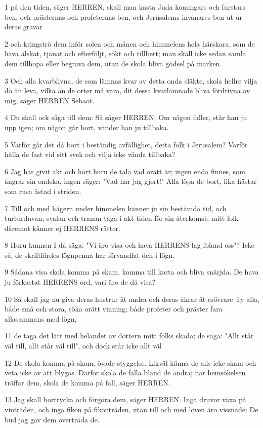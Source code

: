 \par 1 på den tiden, säger HERREN, skall man kasta Juda konungars och furstars ben, och prästernas och profeternas ben, och Jerusalems invånares ben ut ur deras gravar
\par 2 och kringströ dem inför solen och månen och himmelens hela härskara, som de hava älskat, tjänat och efterföljt, sökt och tillbett; man skall icke sedan samla dem tillhopa eller begrava dem, utan de skola bliva gödsel på marken.
\par 3 Och alla kvarblivna, de som lämnas kvar av detta onda släkte, skola hellre vilja dö än leva, vilka än de orter må vara, dit dessa kvarlämnade bliva fördrivna av mig, säger HERREN Sebaot.
\par 4 Du skall ock säga till dem: Så säger HERREN: Om någon faller, står han ju upp igen; om någon går bort, vänder han ju tillbaka.
\par 5 Varför går det då bort i beständig avfällighet, detta folk i Jerusalem? Varför hålla de fast vid sitt svek och vilja icke vända tillbaka?
\par 6 Jag har givit akt och hört huru de tala vad orätt är; ingen enda finnes, som ångrar sin ondska, ingen säger: "Vad har jag gjort!" Alla löpa de bort, lika hästar som rusa åstad i striden.
\par 7 Till och med hägern under himmelen känner ju sin bestämda tid, och turturduvan, svalan och tranan taga i akt tiden för sin återkomst; mitt folk däremot känner ej HERRENS rätter.
\par 8 Huru kunnen I då säga: "Vi äro visa och hava HERRENS lag ibland oss"? Icke så, de skriftlärdes lögnpenna har förvandlat den i lögn.
\par 9 Sådana visa skola komma på skam, komma till korta och bliva snärjda. De hava ju förkastat HERRENS ord, vari äro de då visa?
\par 10 Så skall jag nu giva deras hustrur åt andra och deras åkrar åt erövrare Ty alla, både små och stora, söka orätt vinning; både profeter och präster fara allasammans med lögn,
\par 11 de taga det lätt med helandet av dottern mitt folks skada; de säga: "Allt står väl till, allt står väl till", och dock står icke allt väl
\par 12 De skola komma på skam, övade styggelse. Likväl känna de alls icke skam och veta icke av att blygas. Därför skola de falla bland de andra; när hemsökelsen träffar dem, skola de komma på fall, säger HERREN.
\par 13 Jag skall bortrycka och förgöra dem, säger HERREN. Inga druvor växa på vinträden, och inga fikon på fikonträden, utan till och med löven äro vissnade: De bud jag gav dem överträda de.
